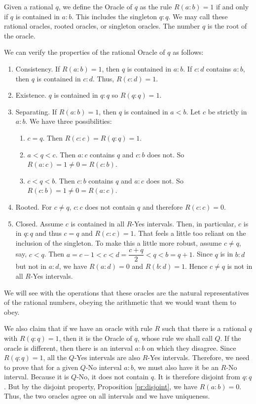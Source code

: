 \documentclass[12pt]{article}
\theoremstyle{remark}
\begin{document}
Given a rational $q$, we define the Oracle of $q$ as the rule $R(a:b) = 1$ if and only if $q$ is contained in $a:b$. This includes the singleton $q:q$.  We may call these rational oracles, rooted oracles, or singleton oracles. The number $q$ is the root of the oracle. 

We can verify the properties of the rational Oracle of $q$ as follows: 

\begin{enumerate}
    \item Consistency. If $R(a:b)=1$, then $q$ is contained in $a:b$. If $c:d$ contains $a:b$, then $q$ is contained in $c:d$. Thus, $R(c:d)=1$.
    \item Existence. $q$ is contained in $q:q$ so $R(q:q)=1$.
    \item Separating. If $R(a:b) =1$, then $q$ is contained in $a\lt b$. Let $c$ be strictly in $a:b$. We have three possibilities: 
    \begin{enumerate}
    \item $c=q$. Then $R(c:c) = R(q:q) = 1$.
    \item $a \lt q \lt c$. Then $a:c$ contains $q$ and $c:b$ does not. So $R(a:c)=1 \neq 0 =R(c:b)$.
    \item $c \lt q \lt b$. Then $c:b$ contains $q$ and $a:c$ does not. So $R(c:b)=1 \neq 0 =R(a:c)$.
    \end{enumerate}    
    \item Rooted. For $c \neq q$, $c:c$ does not contain $q$ and therefore $R(c:c)=0$.
    \item Closed. Assume $c$ is contained in all $R$-Yes intervals. Then, in particular, $c$ is in $q:q$ and thus $c=q$ and $R(c:c)=1$. That feels a little too reliant on the inclusion of the singleton. To make this a little more robust, assume $c \neq q$, say, $c < q$. Then  $a=c-1 < c < d=\dfrac{c+q}{2} < q < b=q+1$. Since $q$ is in $b:d$ but not in $a:d$, we have $R(a:d)=0$ and $R(b:d)=1$. Hence $c \neq q$ is not in all $R$-Yes intervals.
\end{enumerate}

We will see with the operations that these oracles are the natural representatives of the rational numbers, obeying the arithmetic that we would want them to obey.  

We also claim that if we have an oracle with rule $R$ such that there is a rational $q$ with $R(q:q)=1$, then it is the Oracle of $q$, whose rule we shall call $Q$. If the oracle is different, then there is an interval $a:b$ on which they disagree. Since $R(q:q) =1$, all the  $Q$-Yes intervals are also $R$-Yes intervals. Therefore, we need to prove that for a given  $Q$-No interval $a:b$, we must also have it be an $R$-No interval. Because it is $Q$-No, it does not contain $q$. It is therefore disjoint from $q:q$. But by the disjoint property, Proposition \ref{pr:disjoint}, we have $R(a:b)=0$. Thus, the two oracles agree on all intervals and we have uniqueness. 
\end{document}
